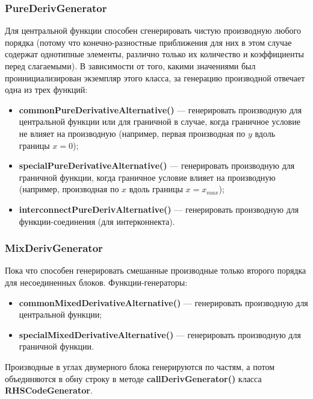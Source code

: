 \documentclass[a4paper]{article}
\begin{document}
\subsubsection{\large PureDerivGenerator}
Для центральной функции способен сгенерировать чистую производную любого порядка (потому что конечно-разностные приближения для них в этом случае содержат однотипные элементы, различно только их ко\-ли\-че\-ство и коэффициенты перед слагаемыми). В зависимости от того, какими значениями был проинициализирован экземпляр этого класса, за генерацию производной отвечает одна из трех функций:
\begin{itemize}
\item {\bf commonPureDerivativeAlternative()} --- генерировать производную для центральной функции или для граничной в случае, когда гра\-нич\-ное условие не влияет на производную (например, первая про\-из\-вод\-ная по $y$ вдоль границы $x = 0$);
\item {\bf specialPureDerivativeAlternative()} --- генерировать производную для граничной функции, когда граничное условие влияет на про\-из\-вод\-ную (например, производная по $x$ вдоль границы $x = x_{max}$);
\item {\bf interconnectPureDerivAlternative()} --- генерировать производную для функции-соединения (для интерконнекта).
\end{itemize} 

\subsubsection{\large MixDerivGenerator}
Пока что способен генерировать смешанные производные только второго порядка для несоединенных блоков. Функции-генераторы:
\begin{itemize}
\item {\bf commonMixedDerivativeAlternative()} --- генерировать производную для центральной функции;
\item {\bf specialMixedDerivativeAlternative()} --- генерировать производную для граничной функции.
\end{itemize}

Производные в углах двумерного блока генерируются по частям, а потом объединяются в обну строку в методе {\bf callDerivGenerator()} класса {\bf RHSCodeGenerator}.

\newpage
\end{document}
